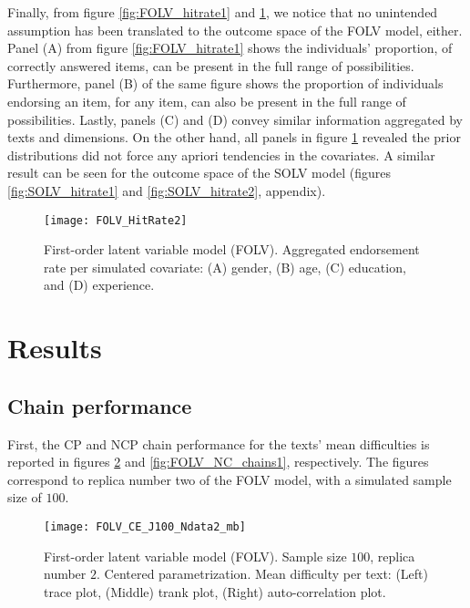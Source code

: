 Finally, from figure \ref{fig:FOLV_hitrate1} and \ref{fig:FOLV_hitrate2}, we notice that no unintended assumption has been translated to the outcome space of the FOLV model, either. Panel (A) from figure \ref{fig:FOLV_hitrate1} shows the individuals'  proportion, of correctly answered items, can be present in the full range of possibilities. Furthermore, panel (B) of the same figure shows the proportion of individuals endorsing an item, for any item, can also be present in the full range of possibilities. Lastly, panels (C) and (D) convey similar information aggregated by texts and dimensions. On the other hand, all panels in figure \ref{fig:FOLV_hitrate2} revealed the prior distributions did not force any apriori tendencies in the covariates. A similar result can be seen for the outcome space of the SOLV model (figures \ref{fig:SOLV_hitrate1} and \ref{fig:SOLV_hitrate2}, appendix).
%
\begin{figure}[h]
	\centering
	\texttt{[image: FOLV\_HitRate2]}
	\caption[First-order latent variable model (FOLV). Hit rate per simulated covariate.]%
	{First-order latent variable model (FOLV). Aggregated endorsement rate per simulated covariate: (A) gender, (B) age, (C) education, and (D) experience.}
	\label{fig:FOLV_hitrate2}
\end{figure}


\section{Results}

\subsection{Chain performance} \label{sub_sect:ergodicity_simulation}

First, the CP and NCP chain performance for the texts' mean difficulties is reported in figures \ref{fig:FOLV_CE_chains1} and \ref{fig:FOLV_NC_chains1}, respectively. The figures correspond to replica number two of the FOLV model, with a simulated sample size of $100$. 
%
\begin{figure}[H]
	\centering
	\texttt{[image: FOLV\_CE\_J100\_Ndata2\_mb]}
	\caption[First-order latent variable model (FOLV). Sample size $100$, replica number $2$. Centered parametrization. Mean difficulty per text. Trace, trank and auto-correlation plots.]%
	{First-order latent variable model (FOLV). Sample size $100$, replica number $2$. Centered parametrization. Mean difficulty per text: (Left) trace plot, (Middle) trank plot, (Right) auto-correlation plot.}
	\label{fig:FOLV_CE_chains1}
\end{figure}

